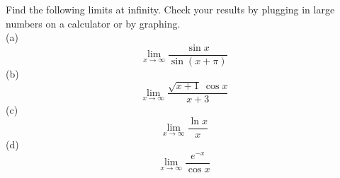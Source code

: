 Find the following limits at infinity. Check your results by plugging in large numbers on a calculator
or by graphing.\\
(a)
\begin{equation*}
  \lim_{x\rightarrow \infty} \frac{\sin x}{\sin(x+\pi)}
\end{equation*}
(b)
\begin{equation*}
  \lim_{x\rightarrow \infty} \frac{\sqrt{x+1}\:\cos x}{x+3}
\end{equation*}
(c)
\begin{equation*}
  \lim_{x\rightarrow \infty} \frac{\ln x}{x}
\end{equation*}
(d)
\begin{equation*}
  \lim_{x\rightarrow \infty} \frac{e^{-x}}{\cos x}
\end{equation*}
